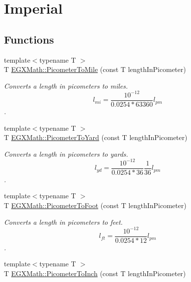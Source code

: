 \hypertarget{group___e_g_x_math-_conversions-_length_conversions-_s_i-_picometer-_imperial}{}\section{Imperial}
\label{group___e_g_x_math-_conversions-_length_conversions-_s_i-_picometer-_imperial}
\subsection*{Functions}
\begin{DoxyCompactItemize}
\item 
{\footnotesize template$<$typename T $>$ }\\T \mbox{\hyperlink{group___e_g_x_math-_conversions-_length_conversions-_s_i-_picometer-_imperial_gae153bd94c8377dd95b8b09bcc56256b0}{E\+G\+X\+Math\+::\+Picometer\+To\+Mile}} (const T length\+In\+Picometer)
\begin{DoxyCompactList}\small\item\em Converts a length in picometers to miles. \[ l_{mi}=\frac{10^{-12}}{0.0254 * 63360} l_{pm} \]. \end{DoxyCompactList}\item 
{\footnotesize template$<$typename T $>$ }\\T \mbox{\hyperlink{group___e_g_x_math-_conversions-_length_conversions-_s_i-_picometer-_imperial_ga18b17a118ffb1092beefc221f44a97a2}{E\+G\+X\+Math\+::\+Picometer\+To\+Yard}} (const T length\+In\+Picometer)
\begin{DoxyCompactList}\small\item\em Converts a length in picometers to yards. \[ l_{yd}= \frac{10^{-12}}{0.0254 * 36} \frac{1}{36} l_{pm} \]. \end{DoxyCompactList}\item 
{\footnotesize template$<$typename T $>$ }\\T \mbox{\hyperlink{group___e_g_x_math-_conversions-_length_conversions-_s_i-_picometer-_imperial_gae83808c99fe5c49c54717302f667ff46}{E\+G\+X\+Math\+::\+Picometer\+To\+Foot}} (const T length\+In\+Picometer)
\begin{DoxyCompactList}\small\item\em Converts a length in picometers to feet. \[ l_{ft}= \frac{10^{-12}}{0.0254 * 12} l_{pm} \]. \end{DoxyCompactList}\item 
{\footnotesize template$<$typename T $>$ }\\T \mbox{\hyperlink{group___e_g_x_math-_conversions-_length_conversions-_s_i-_picometer-_imperial_ga163afd72563986ed456466be07efd3cb}{E\+G\+X\+Math\+::\+Picometer\+To\+Inch}} (const T length\+In\+Picometer)

\end{DoxyCompactItemize}

